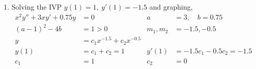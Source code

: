 \begin{enumerate}
    \item Solving the IVP $ y(1) = 1,\ y'(1) = -1.5 $ and graphing,
          \begin{align}
              x^{2}y'' + 3xy' + 0.75y & = 0                             & a            & = 3, \quad b= 0.75            \\
              (a-1)^{2}-4b            & = 1 > 0                         & m_{1}, m_{2} & =  -1.5, -0.5                 \\
              y                       & = c_{1}x^{-1.5} + c_{2}x^{-0.5}                                                \\
              y(1)                    & = c_{1} + c_{2} = 1             & y'(1)        & = -1.5c_{1} - 0.5c_{2} = -1.5 \\
              c_{1}                   & = 1                             & c_{2}        & = 0
          \end{align}
          \begin{figure}[H]
              \centering
          \end{figure}


\end{enumerate}
